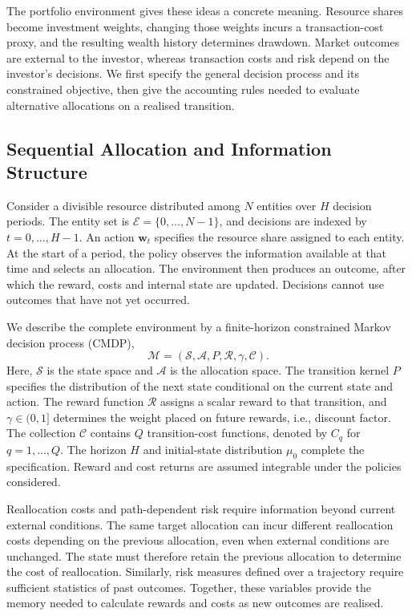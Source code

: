 \documentclass[10pt]{article}
\begin{document}
The portfolio environment gives these ideas a concrete meaning. Resource shares become investment weights, changing those weights incurs a transaction-cost proxy, and the resulting wealth history determines drawdown. Market outcomes are external to the investor, whereas transaction costs and risk depend on the investor's decisions. We first specify the general decision process and its constrained objective, then give the accounting rules needed to evaluate alternative allocations on a realised transition.

\subsection{Sequential Allocation and Information Structure}

Consider a divisible resource distributed among $N$ entities over $H$ decision periods. The entity set is $\mathcal E=\{0,\ldots,N-1\}$, and decisions are indexed by $t=0,\ldots,H-1$. An action $\bm w_t$ specifies the resource share assigned to each entity. At the start of a period, the policy observes the information available at that time and selects an allocation. The environment then produces an outcome, after which the reward, costs and internal state are updated. Decisions cannot use outcomes that have not yet occurred.

We describe the complete environment by a finite-horizon constrained Markov decision process (CMDP),
\begin{equation}
  \mathcal M=(\mathcal S,\mathcal A,P,\mathcal R,\gamma,\mathcal C).
  \label{eq:allocation-mdp}
\end{equation}
Here, $\mathcal S$ is the state space and $\mathcal A$ is the allocation space. The transition kernel $P$ specifies the distribution of the next state conditional on the current state and action. The reward function $\mathcal R$ assigns a scalar reward to that transition, and $\gamma\in(0,1]$ determines the weight placed on future rewards, i.e., discount factor. The collection $\mathcal C$ contains $Q$ transition-cost functions, denoted by $C_q$ for $q=1,\ldots,Q$. The horizon $H$ and initial-state distribution $\mu_0$ complete the specification. Reward and cost returns are assumed integrable under the policies considered.

Reallocation costs and path-dependent risk require information beyond current external conditions. The same target allocation can incur different reallocation costs depending on the previous allocation, even when external conditions are unchanged. The state must therefore retain the previous allocation to determine the cost of reallocation. Similarly, risk measures defined over a trajectory require sufficient statistics of past outcomes. Together, these variables provide the memory needed to calculate rewards and costs as new outcomes are realised.
\end{document}
